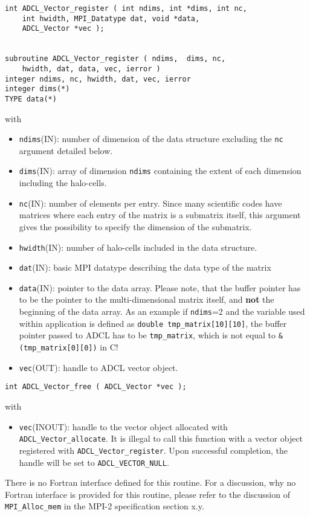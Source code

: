\hspace{1cm}
\begin{verbatim}
int ADCL_Vector_register ( int ndims, int *dims, int nc, 
    int hwidth, MPI_Datatype dat, void *data, 
    ADCL_Vector *vec );


subroutine ADCL_Vector_register ( ndims,  dims, nc, 
    hwidth, dat, data, vec, ierror )
integer ndims, nc, hwidth, dat, vec, ierror
integer dims(*)
TYPE data(*)
\end{verbatim}
with
\begin{itemize}
\item {\tt ndims}(IN): number of dimension of the data structure excluding the {\tt nc} argument detailed below.
\item {\tt dims}(IN): array of dimension {\tt ndims} containing the extent of each dimension including the halo-cells.
\item {\tt nc}(IN): number of elements per entry. Since many scientific codes have matrices where each entry of the 
	matrix is a submatrix itself, this argument gives the possibility to specify the dimension of the submatrix.
\item {\tt hwidth}(IN): number of halo-cells included in the data structure.
\item {\tt dat}(IN): basic MPI datatype describing the data type of the matrix
\item {\tt data}(IN): pointer to the data array. Please note, that the buffer pointer has to be the pointer to the multi-dimensional matrix itself, and {\bf not} the beginning of the data array. As an example if {\tt ndims}=2 and the variable used within application is defined as {\tt double tmp\_matrix[10][10]}, the buffer pointer passed to ADCL has to be {\tt tmp\_matrix}, which is not equal to {\tt \&(tmp\_matrix[0][0])} in C!
\item {\tt vec}(OUT): handle to ADCL vector object.
\end{itemize}

\hspace{1cm}

\begin{verbatim}
int ADCL_Vector_free ( ADCL_Vector *vec );
\end{verbatim}
with
\begin{itemize}
\item {\tt vec}(INOUT): handle to the vector object allocated with {\tt ADCL\_Vector\-\_allocate}. It is illegal to call 
 this function with a vector object registered with {\tt ADCL\_Vector\_register}. Upon successful completion, the handle will be set to {\tt ADCL\_VECTOR\_NULL}.
\end{itemize}
There is no Fortran interface defined for this routine. For a discussion, why no Fortran interface is provided for this routine, please refer to the discussion of {\tt MPI\_Alloc\_mem} in the MPI-2 specification section x.y.
\hspace{1cm}

